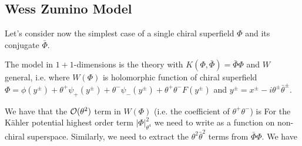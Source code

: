 \documentclass{article}
\begin{document}
\subsection{Wess Zumino Model}
Let's consider now the simplest case of a single chiral superfield $\Phi$ and its conjugate $\bar{\Phi}$. \begin{definition}
	The  model in $1+1$-dimensions is the theory with $K(\Phi,\bar{\Phi}) = \bar{\Phi} \Phi$
and $W$ general, i.e.  
where $W(\Phi)$ is holomorphic function of chiral superfield $\Phi =\phi(y^\pm) + \theta^+ \psi_+(y^\pm) + \theta^- \psi_- (y^\pm) + \theta^+ \theta^- F(y^\pm)$ and $y^\pm = x^\pm - i \theta^\pm \bar{\theta}^\pm$.
\end{definition} We have that the $\mathcal{O}(\theta^2)$ term in $W(\Phi)$ (i.e. the coefficient of $\theta^+\theta^-$) is 
For the K\"ahler potential highest order term $|\Phi|^2_{\theta^4}$  we need to write
as a function on non-chiral superspace. 
Similarly, 
we need to extract the $\theta^2 \bar{\theta}^2$ terms from $\bar{\Phi} \Phi$. We have 
\end{document}
